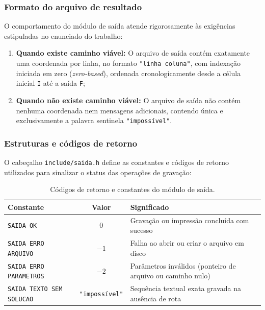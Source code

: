 \documentclass[12pt,a4paper]{article}
\makeatletter
\DeclareRobustCommand{\_}{%
  \ifmmode
    \nfss@text{\textunderscore}%
  \else
    \textunderscore\allowbreak
  \fi
}
\makeatother
\begin{document}
\subsubsection*{Formato do arquivo de resultado}

O comportamento do módulo de saída atende rigorosamente às exigências estipuladas no enunciado do trabalho:
\begin{enumerate}
    \item \textbf{Quando existe caminho viável:} O arquivo de saída contém exatamente uma coordenada por linha, no formato \texttt{"linha coluna"}, com indexação iniciada em zero (\textit{zero-based}), ordenada cronologicamente desde a célula inicial \texttt{I} até a saída \texttt{F};
    \item \textbf{Quando não existe caminho viável:} O arquivo de saída não contém nenhuma coordenada nem mensagens adicionais, contendo única e exclusivamente a palavra sentinela \texttt{"impossível"}.
\end{enumerate}

\subsubsection*{Estruturas e códigos de retorno}

O cabeçalho \texttt{include/saida.h} define as constantes e códigos de retorno utilizados para sinalizar o status das operações de gravação:

\begin{table}[htbp]
\centering
\small
\caption{Códigos de retorno e constantes do módulo de saída.}
\label{tab:codigos_saida}
\vspace{0.2cm}
\begin{tabularx}{\textwidth}{|>{\raggedright\arraybackslash}p{4.8cm}|c|>{\raggedright\arraybackslash}X|}
\hline
\textbf{Constante} & \textbf{Valor} & \textbf{Significado} \\
\hline
\texttt{SAIDA\_OK} & 0 & Gravação ou impressão concluída com sucesso \\
\hline
\texttt{SAIDA\_ERRO\_ARQUIVO} & $-1$ & Falha ao abrir ou criar o arquivo em disco \\
\hline
\texttt{SAIDA\_ERRO\_PARAMETROS} & $-2$ & Parâmetros inválidos (ponteiro de arquivo ou caminho nulo) \\
\hline
\texttt{SAIDA\_TEXTO\_SEM\_SOLUCAO} & \texttt{"impossível"} & Sequência textual exata gravada na ausência de rota \\
\hline
\end{tabularx}
\end{table}
\end{document}
